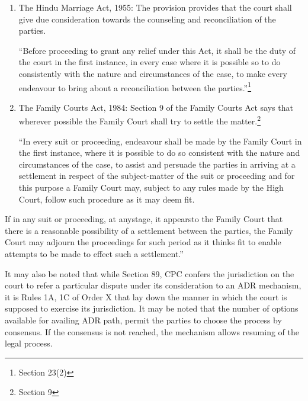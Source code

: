 \begin{multicols}{2}
\begin{enumerate}
\item The Hindu Marriage Act, 1955: The provision provides that the court shall give due
consideration towards the counseling and reconciliation of the parties.

\noi
“Before proceeding to grant any relief under this Act, it shall be the duty of the court in the first
instance, in every case where it is possible so to do consistently with the nature and circumstances of the case, to make every endeavour to bring about a reconciliation between the parties.”\footnote{Section 23(2)}

\item The Family Courts Act, 1984: Section 9 of the Family Courts Act says that wherever possible the Family Court shall try to settle the matter.\footnote{Section 9}

\noi
“In every suit or proceeding, endeavour shall be made by the Family Court in the first instance,
where it is possible to do so consistent with the nature and circumstances of the case, to assist
and persuade the parties in arriving at a settlement in respect of the subject-matter of the suit
or proceeding and for this purpose a Family Court may, subject to any rules made by the High
Court, follow such procedure as it may deem fit.
\end{enumerate}

\vspace{-.4cm}

\noi
If in any suit or proceeding, at anystage, it appearsto the Family Court that there is a reasonable
possibility of a settlement between the parties, the Family Court may adjourn the proceedings
for such period as it thinks fit to enable attempts to be made to effect such a settlement.”

\vspace{-.1cm}

\noi
It may also be noted that while Section 89, CPC confers the jurisdiction on the court to refer a
particular dispute under its consideration to an ADR mechanism, it is Rules 1A, 1C of Order
X that lay down the manner in which the court is supposed to exercise its jurisdiction. It may
be noted that the number of options available for availing ADR path, permit the parties to
choose the process by consensus. If the consensus is not reached, the mechanism allows
resuming of the legal process.

\vspace{-.1cm}



\end{multicols}
